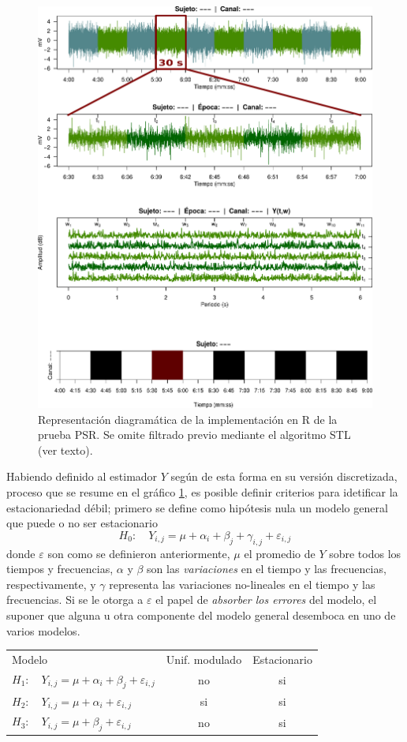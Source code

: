 \begin{figure}
\centering
\includegraphics[width=0.7\linewidth]{./img_diagramas/psr_simple.pdf}
\caption{Representaci\'on diagram\'atica de la implementaci\'on en R de la prueba PSR. Se omite 
filtrado previo mediante el algoritmo STL (ver texto).}
\label{diagrama_psr}
\end{figure}

Habiendo definido al estimador $Y$ según de esta forma en su versión discretizada, proceso que se 
resume en el gráfico \ref{diagrama_psr}, es posible definir criterios para idetificar la 
estacionariedad débil; primero se define como hipótesis nula un modelo general que puede o no ser 
estacionario
%
\begin{equation*}
H_0 : \hspace{1em} Y_{i,j} = \mu + \alpha_i + \beta_j + \gamma_{i,j} + \varepsilon_{i,j}
\end{equation*}
%
donde $\varepsilon$ son como se definieron anteriormente, $\mu$ el promedio de $Y$ sobre todos los
tiempos y frecuencias, $\alpha$ y $\beta$ son las \textit{variaciones} en el tiempo y las 
frecuencias, respectivamente, y $\gamma$ representa las variaciones no-lineales en el tiempo y las 
frecuencias.
%
Si se le otorga a $\varepsilon$ el papel de \textit{absorber los errores} del modelo, el suponer
que alguna u otra componente del modelo general desemboca en uno de varios modelos.

\begin{center}
\begin{tabular}{lcc}
Modelo & Unif. modulado & Estacionario \\
$H_1 : \hspace{1em} Y_{i,j} = \mu + \alpha_i + \beta_j + \varepsilon_{i,j}$ & no & si \\
$H_2 : \hspace{1em} Y_{i,j} = \mu + \alpha_i + \varepsilon_{i,j}$ & si & si \\
$H_3 : \hspace{1em} Y_{i,j} = \mu + \beta_j + \varepsilon_{i,j}$ & no & si \\
\end{tabular}
\end{center}

